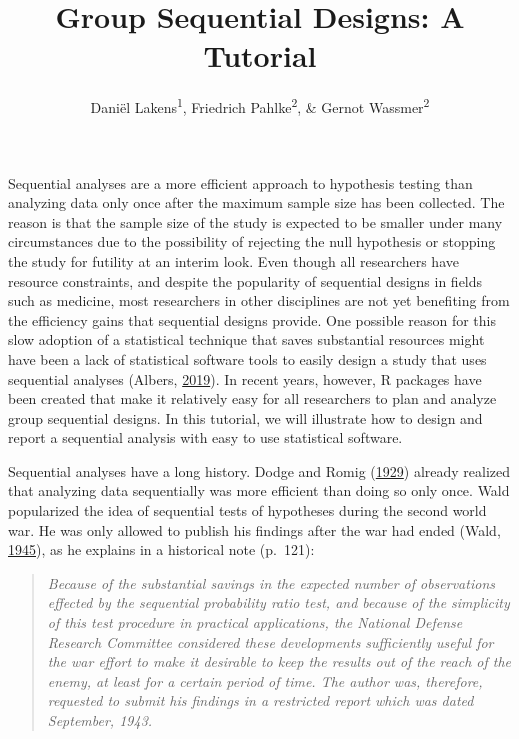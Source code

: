 \documentclass[
  english,
  ,jou, a4paper,floatsintext]{apa6}
\title{Group Sequential Designs: A Tutorial}
\author{Daniël Lakens\textsuperscript{1}, Friedrich Pahlke\textsuperscript{2}, \& Gernot Wassmer\textsuperscript{2}}
\date{}
\affiliation{\vspace{0.5cm}\textsuperscript{1} Eindhoven University of Technology\\\textsuperscript{2} RPACT GbR}
\begin{document}
\maketitle

Sequential analyses are a more efficient approach to hypothesis testing than analyzing data only once after the maximum sample size has been collected. The reason is that the sample size of the study is expected to be smaller under many circumstances due to the possibility of rejecting the null hypothesis or stopping the study for futility at an interim look. Even though all researchers have resource constraints, and despite the popularity of sequential designs in fields such as medicine, most researchers in other disciplines are not yet benefiting from the efficiency gains that sequential designs provide. One possible reason for this slow adoption of a statistical technique that saves substantial resources might have been a lack of statistical software tools to easily design a study that uses sequential analyses (Albers, \protect\hyperlink{ref-albers_problem_2019}{2019}). In recent years, however, R packages have been created that make it relatively easy for all researchers to plan and analyze group sequential designs. In this tutorial, we will illustrate how to design and report a sequential analysis with easy to use statistical software.

Sequential analyses have a long history. Dodge and Romig (\protect\hyperlink{ref-dodge_method_1929}{1929}) already realized that analyzing data sequentially was more efficient than doing so only once. Wald popularized the idea of sequential tests of hypotheses during the second world war. He was only allowed to publish his findings after the war had ended (Wald, \protect\hyperlink{ref-wald_sequential_1945}{1945}), as he explains in a historical note (p.~121):

\begin{quote}
\emph{Because of the substantial savings in the expected number of observations effected by the sequential probability ratio test, and because of the simplicity of this test procedure in practical applications, the National Defense Research Committee considered these developments sufficiently useful for the war effort to make it desirable to keep the results out of the reach of the enemy, at least for a certain period of time. The author was, therefore, requested to submit his findings in a restricted report which was dated September, 1943.}
\end{quote}
\end{document}
